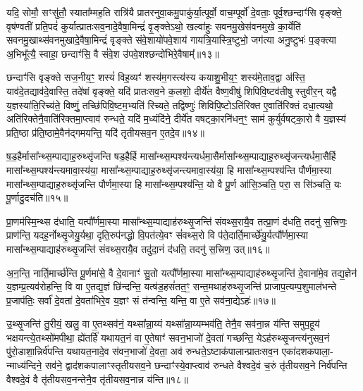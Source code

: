 {\anuvakamend[{आ॒दि॒त्यस्तस्यै॒व द्वे च॑॥४॥}]}

यदि॒ सोमौ॒ सꣳसु॑तौ॒ स्याता᳚म्मह॒ति रात्रि॑यै प्रातरनुवा॒कमु॒पाकु॑र्या॒त्पूर्वो॒ वाच॒म्पूर्वो॑ दे॒वताः॒ पूर्व॒श्छन्दाꣳ॑सि वृङ्क्ते॒ वृष॑ण्वतीं प्रति॒पदं॑ कुर्यात्प्रातःसव॒नादे॒वैषा॒मिन्द्रं॑ वृ॒ङ्क्ते\-ऽथो॒ खल्वा॑हुः सवनमु॒खेस॑वनमुखे का॒र्येति॑ सवनमु॒खाथ्स॑वनमुखादे॒वैषा॒मिन्द्रं॑ वृङ्क्ते संवे॒शायो॑पवे॒शाय॑ गायत्रि॒यास्त्रि॒ष्टुभो॒ जग॑त्या अनु॒ष्टुभः॑ प॒ङ्क्त्या अ॒भिभू᳚त्यै॒ स्वाहा॒ छन्दाꣳ॑सि॒ वै सं॑वे॒श उ॑पवे॒शश्छन्दो॑भिरे॒वैषाम्᳚॥१३॥

छन्दाꣳ॑सि वृङ्क्ते सज॒नीय॒ꣳ॒ शस्यं॑ विह॒व्यꣳ॑ शस्य॑म॒गस्त्य॑स्य कयाशु॒भीय॒ꣳ॒ शस्य॑मे॒ताव॒द्वा अ॑स्ति॒ याव॑दे॒तद्याव॑दे॒वास्ति॒ तदे॑षां वृङ्क्ते॒ यदि॑ प्रातःसव॒ने क॒लशो॒ दीर्ये॑त वैष्ण॒वीषु॑ शिपिवि॒ष्टव॑तीषु स्तुवीर॒न् यद्वै य॒ज्ञस्या॑ति॒रिच्य॑ते॒ विष्णुं॒ तच्छि॑पिवि॒ष्टम॒भ्यति॑ रिच्यते॒ तद्विष्णुः॑ शिविपि॒ष्टो\-ऽति॑रिक्त ए॒वाति॑रिक्तं दधा॒त्यथो॒ अति॑रिक्तेनै॒वाति॑रिक्तमा॒प्त्वाव॑ रुन्धते॒ यदि॑ म॒ध्यंदि॑ने॒ दीर्ये॑त वषट्का॒रनि॑धन॒ꣳ॒ साम॑ कुर्युर्वषट्का॒रो वै य॒ज्ञस्य॑ प्रति॒ष्ठा प्र॑ति॒ष्ठामे॒वैन॑द्गमयन्ति॒ यदि॑ तृतीयसव॒न ए॒तदे॒व॥१४॥

{\anuvakamend[{छन्दो॑भिरे॒वैषा॒मवैका॒न्नविꣳ॑श॒तिश्च॑॥५॥}]}

ष॒ड॒हैर्मासा᳚न्थ्स॒म्पाद्याह॒रुथ्सृ॑जन्ति षड॒हैर्\mbox{}हि मासा᳚न्थ्स॒म्पश्य॑न्त्यर्धमा॒सैर्मासा᳚न्थ्स॒म्पाद्याह॒रुथ्सृ॑जन्त्यर्धमा॒सैर्\mbox{}हि मासा᳚न्थ्स॒म्पश्य॑न्त्यमावा॒स्य॑या॒ मासा᳚न्थ्स॒म्पाद्याह॒रुथ्सृ॑जन्त्यमावा॒स्य॑या॒ हि मासा᳚न्थ्स॒म्पश्य॑न्ति पौर्णमा॒स्या मासा᳚न्थ्स॒म्पाद्याह॒रुथ्सृ॑जन्ति पौर्णमा॒स्या हि मासा᳚न्थ्स॒म्पश्य॑न्ति॒ यो वै पू॒र्ण आ॑सि॒ञ्चति॒ परा॒ स सि॑ञ्चति॒ यः पू॒र्णादु॒दच॑ति॥१५॥

प्रा॒णम॑स्मि॒न्थ्स द॑धाति॒ यत्पौ᳚र्णमा॒स्या मासा᳚न्थ्स॒म्पाद्याह॑रुथ्सृ॒जन्ति॑ संवथ्स॒रायै॒व तत्प्रा॒णं द॑धति॒ तदनु॑ स॒त्त्रिणः॒ प्राण॑न्ति॒ यदह॒र्नोथ्सृ॒जेयु॒र्यथा॒ दृति॒रुप॑नद्धो वि॒पत॑त्ये॒वꣳ सं॑वथ्स॒रो वि प॑ते॒दार्ति॒मार्च्छे॑यु॒र्यत्पौ᳚र्णमा॒स्या मासा᳚न्थ्स॒म्पाद्याह॑रुथ्सृ॒जन्ति॑ संवथ्स॒रायै॒व तदु॑दा॒नं द॑धति॒ तदनु॑ स॒त्त्रिण॒ उत्॥१६॥

अ॒न॒न्ति॒ नार्ति॒मार्च्छ॑न्ति पू॒र्णमा॑से॒ वै दे॒वानाꣳ॑ सु॒तो यत्पौ᳚र्णमा॒स्या मासा᳚न्थ्स॒म्पाद्याह॑रुथ्सृ॒जन्ति॑ दे॒वाना॑मे॒व तद्य॒ज्ञेन॑ य॒ज्ञम्प्र॒त्यव॑रोहन्ति॒ वि वा ए॒तद्य॒ज्ञं छि॑न्दन्ति॒ यत्ष॑ड॒हसं॑तत॒ꣳ॒ सन्त॒मथाह॑रुथ्सृ॒जन्ति॑ प्राजाप॒त्यम्प॒शुमाल॑भन्ते प्र॒जाप॑तिः॒ सर्वा॑ दे॒वता॑ दे॒वता॑भिरे॒व य॒ज्ञꣳ सं त॑न्वन्ति॒ यन्ति॒ वा ए॒ते सव॑ना॒द्ये\-ऽहः॑॥१७॥

उ॒थ्सृ॒जन्ति॑ तु॒रीयं॒ खलु॒ वा ए॒तथ्सव॑नं॒ यथ्सा᳚न्ना॒य्यं यथ्सा᳚न्ना॒य्यम्भव॑ति॒ तेनै॒व सव॑ना॒न्न य॑न्ति समुप॒हूय॑ भक्षयन्त्ये॒तथ्सो॑मपीथा॒ ह्ये॑तर्\mbox{}हि॑ यथायत॒नं वा ए॒तेषाꣳ॑ सवन॒भाजो॑ दे॒वता॑ गच्छन्ति॒ ये\-ऽह॑रुथ्सृ॒जन्त्य॑नुसव॒नं पु॑रो॒डाशा॒न्निर्व॑पन्ति यथायत॒नादे॒व स॑वन॒भाजो॑ दे॒वता॒ अव॑ रुन्धते॒\-ऽष्टाक॑पालान्प्रातःसव॒न एका॑दशकपाला॒- न्माध्य॑न्दिने॒ सव॑ने॒ द्वाद॑शकपालाꣳस्तृतीयसव॒ने छन्दाꣳ॑स्ये॒वाप्त्वाव॑ रुन्धते वैश्वदे॒वं च॒रुं तृ॑तीयसव॒ने निर्व॑पन्ति वैश्वदे॒वं वै तृ॑तीयसव॒नन्तेनै॒व तृ॑तीयसव॒नान्न य॑न्ति॥१८॥

